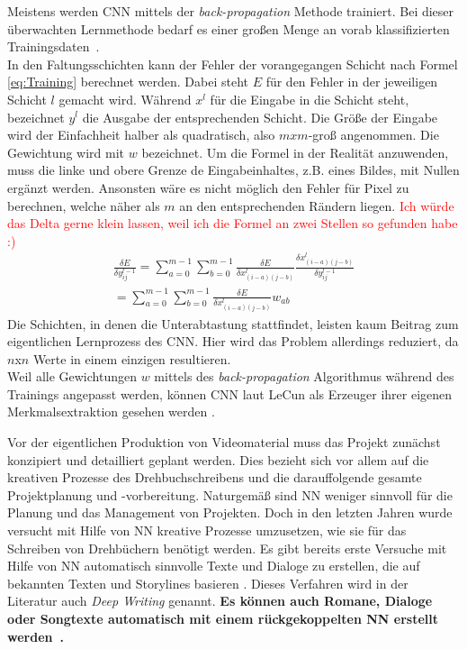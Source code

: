 \documentclass[times, 11pt,twocolumn]{article}
\begin{document}
 \label{sec:Training}
Meistens werden CNN mittels der \textit{back-propagation} Methode trainiert. Bei dieser überwachten Lernmethode bedarf es einer großen Menge an vorab klassifizierten Trainingsdaten~\cite{5537907}.  \\
In den Faltungsschichten kann der Fehler der vorangegangen Schicht nach Formel \ref{eq:Training} berechnet werden. Dabei steht $E$ für den Fehler in der jeweiligen Schicht $l$ gemacht wird. Während $x^l$ für die Eingabe in die Schicht steht, bezeichnet $y^l$ die Ausgabe der entsprechenden Schicht. Die Größe der Eingabe wird der Einfachheit halber als quadratisch, also $mxm$-groß angenommen. Die Gewichtung wird mit $w$ bezeichnet. Um die Formel in der Realität anzuwenden, muss die linke und obere Grenze de Eingabeinhaltes, z.B. eines Bildes, mit Nullen ergänzt werden. Ansonsten wäre es nicht möglich den Fehler für Pixel zu berechnen, welche näher als $m$ an den entsprechenden Rändern liegen. \textcolor{red}{Ich würde das Delta gerne klein lassen, weil ich die Formel an zwei Stellen so gefunden habe :)}\\
\footnotesize
\begin{equation}
\begin{aligned}
\frac{\delta E}{\delta y_{ij}^{l-1}} = \sum_{a=0}^{m-1} \sum_{b=0}^{m-1} \frac{\delta E}{\delta x_{(i-a)(j-b)}^{l}} \frac{\delta x_{(i-a)(j-b)}^{l}}{\delta y_{ij}^{l-1}}  \\
= \sum \limits_{a=0}^{m-1} \sum \limits_{b=0}^{m-1} \frac{\delta E}{\delta x_{(i-a)(j-b)}^{l}} w_{ab}
\end{aligned}
	\label{eq:Training}
\end{equation}
\small
Die Schichten, in denen die Unterabtastung stattfindet, leisten kaum Beitrag zum eigentlichen Lernprozess des CNN. Hier wird das Problem allerdings reduziert, da $n$x$n$ Werte in einem einzigen resultieren. \\
Weil alle Gewichtungen $w$ mittels des \textit{back-propagation} Algorithmus während des Trainings angepasst werden, können CNN laut LeCun als Erzeuger ihrer eigenen Merkmalsextraktion gesehen werden \cite{LeCun:1998:CNI:303568.303704}.


 \label{sec:Konzeption}
Vor der eigentlichen Produktion von Videomaterial muss das Projekt zunächst konzipiert und detailliert geplant werden. Dies bezieht sich vor allem auf die kreativen Prozesse des Drehbuchschreibens und die darauffolgende gesamte Projektplanung und -vorbereitung. Naturgemäß sind NN weniger sinnvoll für die Planung und das Management von Projekten. Doch in den letzten Jahren wurde versucht mit Hilfe von NN kreative Prozesse umzusetzen, wie sie für das Schreiben von Drehbüchern benötigt werden. Es gibt bereits erste Versuche mit Hilfe von NN automatisch sinnvolle Texte und Dialoge zu erstellen, die auf bekannten Texten und Storylines basieren \cite{Thoma16}. Dieses Verfahren wird in der Literatur auch \textit{Deep Writing} genannt. \textbf{Es können auch Romane, Dialoge oder Songtexte automatisch mit einem rückgekoppelten NN erstellt werden~\cite{DrehbuchWrite}.}
\end{document}

